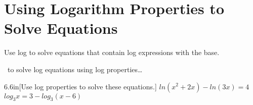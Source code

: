 \section{Using Logarithm Properties to Solve Equations}

Use log  
to solve equations that contain  log expressions
with the  base.

\begin{myConceptSteps}{~to solve log equations using log properties\dots}
\end{myConceptSteps}


\begin{my2Problems}{6.6in}[Use log properties to solve these equations.]
    {
        $ ln\left( x^2 + 2x \right)  -  ln(3x)  = 4$
    }
    {
        $  log_3{x} = 3 - log_3(x-6)  $
    }
\end{my2Problems}
